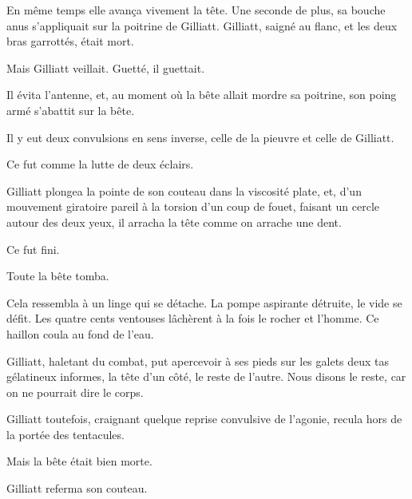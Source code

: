 \documentclass[french,twoside]{book} %
\begin{document}
En même temps elle avança vivement la tête. Une seconde de plus, sa bouche anus s’appliquait sur la poitrine de Gilliatt. Gilliatt, saigné au flanc, et les deux bras garrottés, était mort.\par
Mais Gilliatt veillait. Guetté, il guettait.\par
Il évita l’antenne, et, au moment où la bête allait mordre sa poitrine, son poing armé s’abattit sur la bête.\par
Il y eut deux convulsions en sens inverse, celle de la pieuvre et celle de Gilliatt.\par
Ce fut comme la lutte de deux éclairs.\par
Gilliatt plongea la pointe de son couteau dans la viscosité plate, et, d’un mouvement giratoire pareil à la torsion d’un coup de fouet, faisant un cercle autour des deux yeux, il arracha la tête comme on arrache une dent.\par
Ce fut fini.\par
Toute la bête tomba.\par
Cela ressembla à un linge qui se détache. La pompe aspirante détruite, le vide se défit. Les quatre cents ventouses lâchèrent à la fois le rocher et l’homme. Ce haillon coula au fond de l’eau.\par
Gilliatt, haletant du combat, put apercevoir à ses pieds sur les galets deux tas gélatineux informes, la  tête d’un côté, le reste de l’autre. Nous disons le reste, car on ne pourrait dire le corps.\par
Gilliatt toutefois, craignant quelque reprise convulsive de l’agonie, recula hors de la portée des tentacules.\par
Mais la bête était bien morte.\par
Gilliatt referma son couteau.
\end{document}
